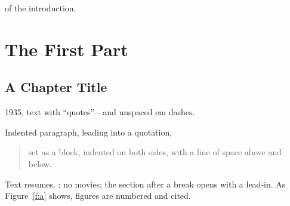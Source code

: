 \documentclass[11pt,twoside,openright]{book}
\begin{document}
\frontmatter
\tableofcontents
{}
 of the introduction.
\mainmatter
\part{The First Part}
\chapter{A Chapter Title}
 1935, text with ``quotes''---and unspaced em dashes.

Indented paragraph, leading into a quotation,
\begin{quote}
set as a block, indented on both sides, with a line of space above and below.
\end{quote}
Text resumes.
; no movies; the section after a break opens with a lead-in.
As Figure~\ref{f:a} shows, figures are numbered and cited.
\end{document}

